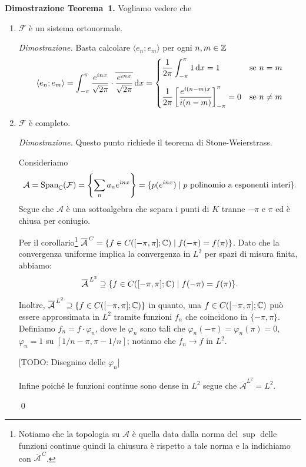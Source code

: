 \vss

\textbf{Dimostrazione Teorema~1.}
Vogliamo vedere che
\begin{enumerate}
	\item $\mathcal F$ è un sistema ortonormale.

		\textit{Dimostrazione.}
		Basta calcolare $\langle e_n; e_m \rangle$ per ogni $n, m \in \mathbb Z$
		$$
		\langle e_n; e_m \rangle
		= \int_{-\pi}^\pi \frac{e^{inx}}{\sqrt{2\pi}} \cdot \overline{\frac{e^{inx}}{\sqrt{2\pi}}} \,\mathrm{d} x
		=
		\begin{cases}
			\displaystyle \frac{1}{2\pi} \int_{-\pi}^\pi 1 \,\mathrm{d} x = 1 & \text{se } n = m \\[15pt]
			\displaystyle \frac{1}{2\pi} \left[ \frac{e^{i(n - m)x}}{i(n - m)} \right]_{-\pi}^\pi = 0& \text{se } n \neq m \\
		\end{cases}
		$$

	\item $\mathcal F$ è completo.

		\textit{Dimostrazione.} Questo punto richiede il teorema di Stone-Weierstrass.

		Consideriamo
		$$
			\mathcal A = \operatorname{Span}_\mathbb C(\mathcal F) = \left\{ \sum_n a_n e^{inx} \right\} = \{ p(e^{inx}) \mid p \text{ polinomio a esponenti interi} \}.
		$$
		Segue che $\mathcal A$ è una sottoalgebra che separa i punti di $K$ tranne $-\pi$ e $\pi$ ed è chiusa per coniugio.

		Per il corollario\footnote{Notiamo che la topologia su $\mathcal A$ è quella data dalla norma del $\sup$ delle funzioni continue quindi la chiusura è rispetto a tale norma e la indichiamo con $\overline{\mathcal A}^{\,C}$.} $\overline{\mathcal A}^{\,C} = \{ f \in C([-\pi, \pi]; \mathbb C) \mid f(-\pi) = f(\pi) \}$. Dato che la convergenza uniforme implica la convergenza in $L^2$ per spazi di misura finita, abbiamo:
		$$
			\overline{\mathcal A}^{\,L^2} \supseteq \{ f \in C([-\pi, \pi]; \mathbb C) \mid f(-\pi) = f(\pi) \}.
		$$

		Inoltre, $\overline{\mathcal A}^{\,L^2} \supseteq \{ f \in C([-\pi, \pi]; \mathbb C) \}$ in quanto, una $f \in C([-\pi, \pi]; \mathbb C)$ può essere approssimata in $L^2$ tramite funzioni $f_n$ che coincidono in $\{-\pi,\pi\}$. Definiamo $f_n = f \cdot \varphi_n$, dove le $\varphi_n$ sono tali che $\varphi_n(-\pi) = \varphi_n(\pi) = 0$, $\varphi_n = 1$ su $[1/n - \pi, \pi - 1/n]$; notiamo che $f_n \to f$ in $L^2$.

		[TODO: Disegnino delle $\varphi_n$]

		Infine poiché le funzioni continue sono dense in $L^2$ segue che $\overline{\mathcal A}^{L^2} = L^2$.

\qed
\end{enumerate}

